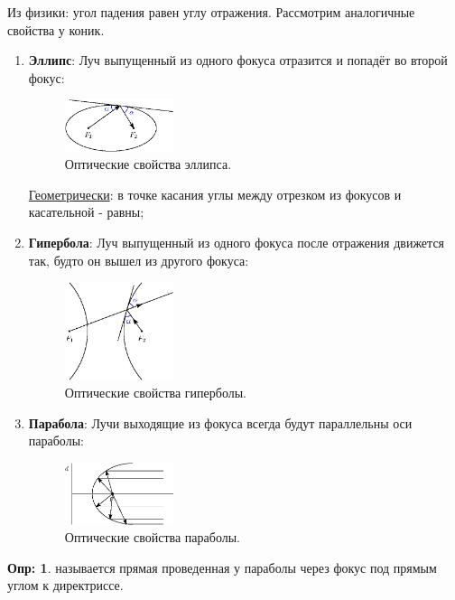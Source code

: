 \documentclass[12pt]{article}
\theoremstyle{definition}
\newtheorem{defn}{Опр:}
\begin{document}
Из физики: угол падения равен углу отражения. Рассмотрим аналогичные свойства у коник.
\begin{enumerate}[label=\arabic*)]
	\item \textbf{Эллипс}: Луч выпущенный из одного фокуса отразится и попадёт во второй фокус:
		\begin{figure}[H]
			\centering
			\includegraphics[width=0.3\textwidth]{ANGL1_17.eps}
			\caption{Оптические свойства эллипса.}
			\label{1_17}
		\end{figure}
	\uline{Геометрически}: в точке касания углы между отрезком из фокусов и касательной - равны;
	\item \textbf{Гипербола}: Луч выпущенный из одного фокуса после отражения движется так, будто он вышел из другого фокуса:
	\begin{figure}[H]
		\centering
		\includegraphics[width=0.3\textwidth]{ANGL1_18.eps}
		\caption{Оптические свойства гиперболы.}
		\label{1_18}
	\end{figure}

	\newpage
	\item \textbf{Парабола}: Лучи выходящие из фокуса всегда будут параллельны оси параболы:
	\begin{figure}[H]
		\centering
		\includegraphics[width=0.3\textwidth]{ANGL1_19.eps}
		\caption{Оптические свойства параболы.}
		\label{1_19}
	\end{figure}
\end{enumerate}
\begin{defn}
	 называется прямая проведенная у параболы через фокус под прямым углом к директриссе.
\end{defn}
\end{document}
